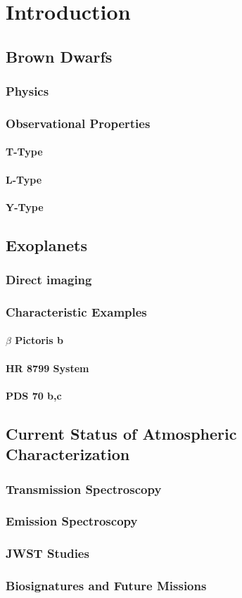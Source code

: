 
\chapter{Introduction}
\section{Brown Dwarfs}
\subsection{Physics}
\subsection{Observational Properties}
\subsubsection{T-Type}
\subsubsection{L-Type}
\subsubsection{Y-Type}
\section{Exoplanets}
\subsection{Direct imaging}
\subsection{Characteristic Examples}
\subsubsection{$\beta$ Pictoris b}
\subsubsection{HR 8799 System}
\subsubsection{PDS 70 b,c}
\section{Current Status of Atmospheric Characterization}
\subsection{Transmission Spectroscopy}
\subsection{Emission Spectroscopy}
\subsection{JWST Studies}
\subsection{Biosignatures and Future Missions}
